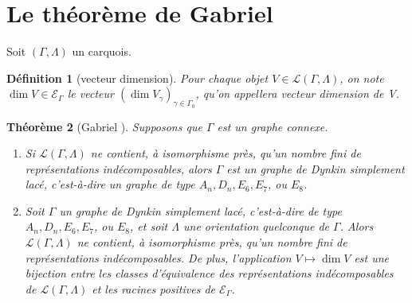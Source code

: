 \documentclass[a4paper,11pt]{article}
\newtheorem{thm}{Théorème}[section]
\newtheorem{defi}[thm]{Définition}%
\newcommand{\EG}{\mathscr{E}_\Gamma}
\begin{document}
\section{Le théorème de Gabriel}
\label{Gab}
Soit $(\Gamma,\Lambda)$ un carquois.
\begin{defi}[vecteur dimension]
	Pour chaque objet $V\in\mathscr L(\Gamma,\Lambda)$, on note $\dim V\in\EG$ le vecteur $(\dim V_\gamma)_{\gamma\in\Gamma_0}$, qu'on appellera \emph{vecteur dimension} de V.
\end{defi}
\begin{thm}[Gabriel \cite{G72}]
	\label{thmGabriel}
	Supposons que $\Gamma$ est un graphe connexe.
	\begin{enumerate}
		\item Si $\mathscr L(\Gamma,\Lambda)$ ne contient, à isomorphisme près, qu'un nombre fini de représentations indécomposables, alors $\Gamma$ est un graphe de Dynkin simplement lacé, c'est-à-dire un graphe de type $A_n,D_n,E_6,E_7$, ou $E_8$.
		\item Soit $\Gamma$ un graphe de Dynkin simplement lacé, c'est-à-dire de type $A_n,D_n,E_6,E_7$, ou $E_8$, et soit $\Lambda$ une orientation quelconque de $\Gamma$. Alors $\mathscr L(\Gamma,\Lambda)$ ne contient, à isomorphisme près, qu'un nombre fini de représentations indécomposables. De plus, l'application $V\mapsto\dim V$ est une bijection entre les classes d'équivalence des représentations indécomposables de $\mathscr L(\Gamma,\Lambda)$ et les racines positives de $\EG$.
	\end{enumerate}
\end{thm}
\end{document}
